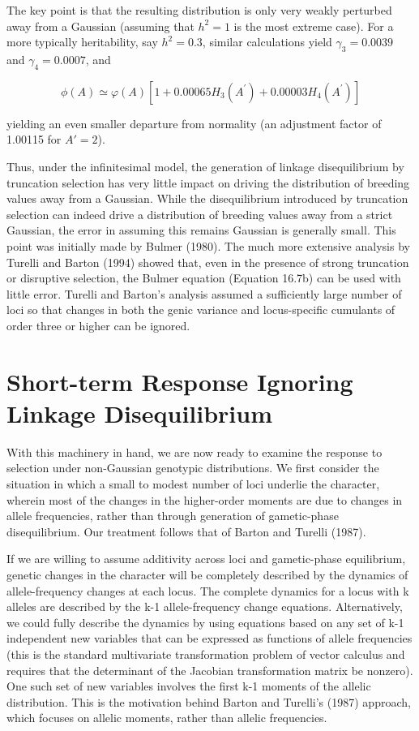 \documentclass{article}
\begin{document}
The key point is that the resulting distribution is only very weakly perturbed away from a Gaussian (assuming that  $ h^2 = 1 $ is the most extreme case). For a more typically heritability, say  $ h^2 = 0.3 $, similar calculations yield  $ \gamma_3 = 0.0039 $ and  $ \gamma_4 = 0.0007 $, and

\begin{equation}
\phi(A)\simeq\varphi(A)\left[1+0.00065H_{3}(A^{\prime})+0.00003H_{4}(A^{\prime})\right]
\end{equation}

yielding an even smaller departure from normality (an adjustment factor of 1.00115 for  $ A' = 2 $).

Thus, under the infinitesimal model, the generation of linkage disequilibrium by truncation selection has very little impact on driving the distribution of breeding values away from a Gaussian. While the disequilibrium introduced by truncation selection can indeed drive a distribution of breeding values away from a strict Gaussian, the error in assuming this remains Gaussian is generally small. This point was initially made by Bulmer (1980). The much more extensive analysis by Turelli and Barton (1994) showed that, even in the presence of strong truncation or disruptive selection, the Bulmer equation (Equation 16.7b) can be used with little error. Turelli and Barton's analysis assumed a sufficiently large number of loci so that changes in both the genic variance and locus-specific cumulants of order three or higher can be ignored.

\section{Short-term Response Ignoring Linkage Disequilibrium}
With this machinery in hand, we are now ready to examine the response to selection under non-Gaussian genotypic distributions. We first consider the situation in which a small to modest number of loci underlie the character, wherein most of the changes in the higher-order moments are due to changes in allele frequencies, rather than through generation of gametic-phase disequilibrium. Our treatment follows that of Barton and Turelli (1987).

If we are willing to assume additivity across loci and gametic-phase equilibrium, genetic changes in the character will be completely described by the dynamics of allele-frequency changes at each locus. The complete dynamics for a locus with k alleles are described by the k-1 allele-frequency change equations. Alternatively, we could fully describe the dynamics by using equations based on any set of k-1 independent new variables that can be expressed as functions of allele frequencies (this is the standard multivariate transformation problem of vector calculus and requires that the determinant of the Jacobian transformation matrix be nonzero). One such set of new variables involves the first k-1 moments of the allelic distribution. This is the motivation behind Barton and Turelli's (1987) approach, which focuses on allelic moments, rather than allelic frequencies.
\end{document}
